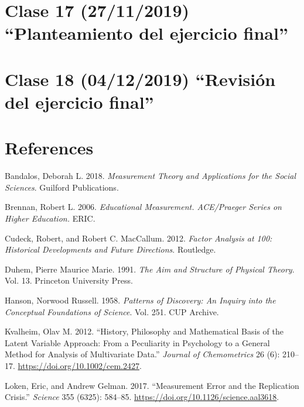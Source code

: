 \documentclass[11pt,]{article}
\begin{document}
\hypertarget{clase-17-27112019-planteamiento-del-ejercicio-final}{%
\section{Clase 17 (27/11/2019) ``Planteamiento del ejercicio
final''}\label{clase-17-27112019-planteamiento-del-ejercicio-final}}

\hypertarget{clase-18-04122019-revision-del-ejercicio-final}{%
\section{Clase 18 (04/12/2019) ``Revisión del ejercicio
final''}\label{clase-18-04122019-revision-del-ejercicio-final}}

\hypertarget{references}{%
\section{References}\label{references}}

\newpage

\hypertarget{refs}{}
\leavevmode\hypertarget{ref-Bandalos2018}{}%
Bandalos, Deborah L. 2018. \emph{Measurement Theory and Applications for
the Social Sciences}. Guilford Publications.

\leavevmode\hypertarget{ref-Brennan2006}{}%
Brennan, Robert L. 2006. \emph{Educational Measurement. ACE/Praeger
Series on Higher Education.} ERIC.

\leavevmode\hypertarget{ref-Cudeck2012}{}%
Cudeck, Robert, and Robert C. MacCallum. 2012. \emph{Factor Analysis at
100: Historical Developments and Future Directions}. Routledge.

\leavevmode\hypertarget{ref-Duhem1991}{}%
Duhem, Pierre Maurice Marie. 1991. \emph{The Aim and Structure of
Physical Theory}. Vol. 13. Princeton University Press.

\leavevmode\hypertarget{ref-Hanson1958}{}%
Hanson, Norwood Russell. 1958. \emph{Patterns of Discovery: An Inquiry
into the Conceptual Foundations of Science}. Vol. 251. CUP Archive.

\leavevmode\hypertarget{ref-Kvalheim2012}{}%
Kvalheim, Olav M. 2012. ``History, Philosophy and Mathematical Basis of
the Latent Variable Approach: From a Peculiarity in Psychology to a
General Method for Analysis of Multivariate Data.'' \emph{Journal of
Chemometrics} 26 (6): 210--17. \url{https://doi.org/10.1002/cem.2427}.

\leavevmode\hypertarget{ref-Loken2017}{}%
Loken, Eric, and Andrew Gelman. 2017. ``Measurement Error and the
Replication Crisis.'' \emph{Science} 355 (6325): 584--85.
\url{https://doi.org/10.1126/science.aal3618}.
\end{document}
